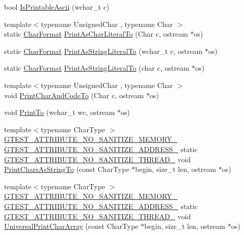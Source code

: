 \begin{DoxyCompactItemize}
\item 
bool \hyperlink{namespacetesting_1_1internal_a744a6dd74c12d1e2c16b3c03e14ed4d4}{Is\+Printable\+Ascii} (wchar\+\_\+t c)
\item 
{\footnotesize template$<$typename Unsigned\+Char , typename Char $>$ }\\static \hyperlink{namespacetesting_1_1internal_ae2ef98247c76a50cdc80ceb4a6c81793}{Char\+Format} \hyperlink{namespacetesting_1_1internal_ab73d250fde6dfbf16111afb7a071dc3f}{Print\+As\+Char\+Literal\+To} (Char c, ostream $\ast$os)
\item 
static \hyperlink{namespacetesting_1_1internal_ae2ef98247c76a50cdc80ceb4a6c81793}{Char\+Format} \hyperlink{namespacetesting_1_1internal_a8c5838995d7bb9e4232b69e6bcdb9ab8}{Print\+As\+String\+Literal\+To} (wchar\+\_\+t c, ostream $\ast$os)
\item 
static \hyperlink{namespacetesting_1_1internal_ae2ef98247c76a50cdc80ceb4a6c81793}{Char\+Format} \hyperlink{namespacetesting_1_1internal_a82e5b3cf45fd9c4603dbe14bc4cb38c2}{Print\+As\+String\+Literal\+To} (char c, ostream $\ast$os)
\item 
{\footnotesize template$<$typename Unsigned\+Char , typename Char $>$ }\\void \hyperlink{namespacetesting_1_1internal_a0c577e598e61d339ba45dd6643fb1969}{Print\+Char\+And\+Code\+To} (Char c, ostream $\ast$os)
\item 
void \hyperlink{namespacetesting_1_1internal_aa74ea9d64f76ce69eceb225ca5ebef58}{Print\+To} (wchar\+\_\+t wc, ostream $\ast$os)
\item 
{\footnotesize template$<$typename Char\+Type $>$ }\\\hyperlink{gtest-port_8h_a2a83dd79037e53814a509cc3f5702650}{G\+T\+E\+S\+T\+\_\+\+A\+T\+T\+R\+I\+B\+U\+T\+E\+\_\+\+N\+O\+\_\+\+S\+A\+N\+I\+T\+I\+Z\+E\+\_\+\+M\+E\+M\+O\+R\+Y\+\_\+} \hyperlink{gtest-port_8h_af18b465f4ba6e36eea7a8d2d79521873}{G\+T\+E\+S\+T\+\_\+\+A\+T\+T\+R\+I\+B\+U\+T\+E\+\_\+\+N\+O\+\_\+\+S\+A\+N\+I\+T\+I\+Z\+E\+\_\+\+A\+D\+D\+R\+E\+S\+S\+\_\+} static \hyperlink{gtest-port_8h_abf30a6b1b3a12ecb2cc1bc1a6f5f9646}{G\+T\+E\+S\+T\+\_\+\+A\+T\+T\+R\+I\+B\+U\+T\+E\+\_\+\+N\+O\+\_\+\+S\+A\+N\+I\+T\+I\+Z\+E\+\_\+\+T\+H\+R\+E\+A\+D\+\_\+} void \hyperlink{namespacetesting_1_1internal_a0be71e6d7cb274131c559193f81c83e2}{Print\+Chars\+As\+String\+To} (const Char\+Type $\ast$begin, size\+\_\+t len, ostream $\ast$os)
\item 
{\footnotesize template$<$typename Char\+Type $>$ }\\\hyperlink{gtest-port_8h_a2a83dd79037e53814a509cc3f5702650}{G\+T\+E\+S\+T\+\_\+\+A\+T\+T\+R\+I\+B\+U\+T\+E\+\_\+\+N\+O\+\_\+\+S\+A\+N\+I\+T\+I\+Z\+E\+\_\+\+M\+E\+M\+O\+R\+Y\+\_\+} \hyperlink{gtest-port_8h_af18b465f4ba6e36eea7a8d2d79521873}{G\+T\+E\+S\+T\+\_\+\+A\+T\+T\+R\+I\+B\+U\+T\+E\+\_\+\+N\+O\+\_\+\+S\+A\+N\+I\+T\+I\+Z\+E\+\_\+\+A\+D\+D\+R\+E\+S\+S\+\_\+} static \hyperlink{gtest-port_8h_abf30a6b1b3a12ecb2cc1bc1a6f5f9646}{G\+T\+E\+S\+T\+\_\+\+A\+T\+T\+R\+I\+B\+U\+T\+E\+\_\+\+N\+O\+\_\+\+S\+A\+N\+I\+T\+I\+Z\+E\+\_\+\+T\+H\+R\+E\+A\+D\+\_\+} void \hyperlink{namespacetesting_1_1internal_ad896a4e4d9133ce43dc18b6038d95dc3}{Universal\+Print\+Char\+Array} (const Char\+Type $\ast$begin, size\+\_\+t len, ostream $\ast$os)

\end{DoxyCompactItemize}

